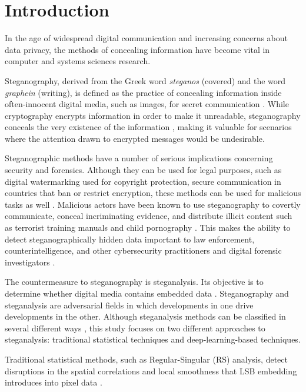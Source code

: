 \chapter{Introduction} \label{cha:introduction}
\pagestyle{plain}

In the age of widespread digital communication and increasing concerns about data privacy, 
the methods of concealing information have become vital in computer and systems sciences research. 

Steganography, derived from the Greek word \textit{steganos} (covered) and the word \textit{graphein} (writing), 
is defined as the practice of concealing information inside often-innocent digital media, such as images, 
for secret communication \cite{Fridrich2002}.
While cryptography encrypts information in order to make it unreadable, steganography conceals the 
very existence of the information \cite{Fridrich2002}, making it valuable for 
scenarios where the attention drawn to encrypted messages would be undesirable.

Steganographic methods have a number of serious implications concerning security and forensics. 
Although they can be used for legal purposes, such as digital watermarking used for copyright protection, 
secure communication in countries that ban or restrict encryption, these methods can be used for malicious tasks as well \cite{Fridrich2002, Eaton2016}.
Malicious actors have been known to use steganography to covertly communicate, conceal incriminating evidence, and 
distribute illicit content such as terrorist training manuals and child pornography \cite{Eaton2016}.
This makes the ability to detect steganographically hidden data important to law enforcement, 
counterintelligence, and other cybersecurity practitioners and digital forensic investigators \cite{Eaton2016}.

The countermeasure to steganography is steganalysis.
Its objective is to determine whether digital media contains embedded data \cite{Fridrich2002}.
Steganography and steganalysis are adversarial fields in which developments in one drive developments in the other.
Although steganalysis methods can be classified in several different ways \cite{Selvaraj2021}, 
this study focuses on two different approaches to steganalysis: traditional statistical techniques and deep-learning-based techniques.

Traditional statistical methods, such as Regular-Singular (RS) analysis, detect disruptions in the spatial correlations and 
local smoothness that LSB embedding introduces into pixel data \cite{Fridrich2001, Manoharan2008}.

